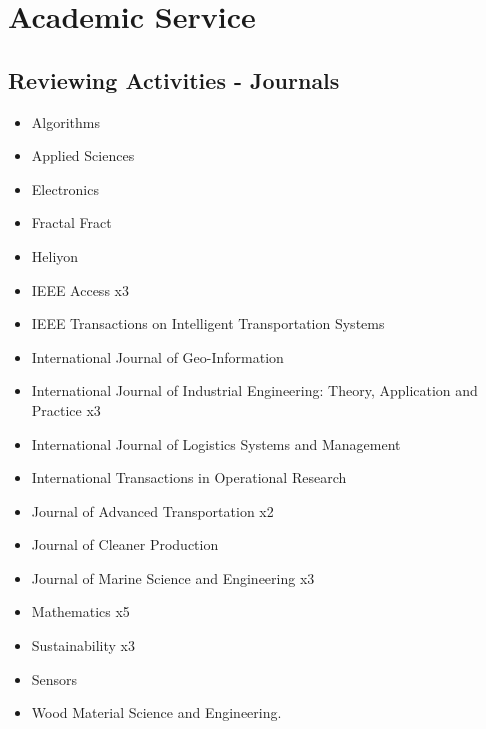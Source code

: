 \section{Academic Service}

\subsection{Reviewing Activities - Journals}

{\begin{itemize}
\item Algorithms
\item Applied Sciences
\item Electronics
\item Fractal Fract
\item Heliyon
\item IEEE Access x3
\item IEEE Transactions on Intelligent Transportation Systems
\item International Journal of Geo-Information
\item International Journal of Industrial Engineering: Theory, Application and Practice x3
\item International Journal of Logistics Systems and Management
\item International Transactions in Operational Research
\item Journal of Advanced Transportation x2
\item Journal of Cleaner Production
\item Journal of Marine Science and Engineering x3
\item Mathematics x5
\item Sustainability x3
\item Sensors
\item Wood Material Science and Engineering.
\end{itemize}
}

